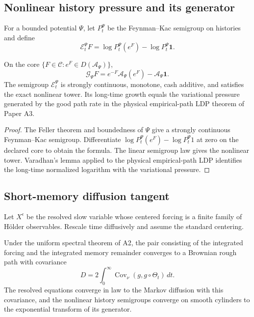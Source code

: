 \subsection{Nonlinear history pressure and its generator}

For a bounded potential \(\Psi\), let \(P_t^\Psi\) be the Feynman--Kac
semigroup on histories and define
\[
 \mathcal E_t^\Psi F
 =
 \log P_t^\Psi(e^F)-\log P_t^\Psi\mathbf1 .
\]

\begin{theorem}
\label{thm:rr2-a4-nonlinear-generator}
On the core
\(\{F\in\mathscr C:e^F\in D(\mathcal A_\Psi)\}\),
\[
 \mathcal G_\Psi F
 =
 e^{-F}\mathcal A_\Psi(e^F)
 -
 \mathcal A_\Psi\mathbf1 .
\]
The semigroup \(\mathcal E_t^\Psi\) is strongly continuous, monotone, cash
additive, and satisfies the exact nonlinear tower.  Its long-time growth
equals the variational pressure generated by the good path rate in
the physical empirical-path LDP theorem of Paper A3.
\end{theorem}

\begin{proof}
The Feller theorem and boundedness of \(\Psi\) give a strongly continuous
Feynman--Kac semigroup.  Differentiate
\(\log P_t^\Psi(e^F)-\log P_t^\Psi1\) at zero on the declared core to obtain
the formula.  The linear semigroup law gives the nonlinear tower.
Varadhan's lemma applied to the physical empirical-path LDP identifies the
long-time normalized logarithm with the variational pressure.
\end{proof}

\subsection{Short-memory diffusion tangent}

Let \(X^\epsilon\) be the resolved slow variable whose centered forcing is a
finite family of Hölder observables.  Rescale time diffusively and assume the
standard centering.

\begin{theorem}
\label{thm:rr2-a4-tangent}
Under the uniform spectral theorem of A2, the pair consisting of the
integrated forcing and the integrated memory remainder converges to a
Brownian rough path with covariance
\[
 D=2\int_0^\infty\operatorname{Cov}_\nu(g,g\circ\Theta_t)\,dt.
\]
The resolved equations converge in law to the Markov diffusion with this
covariance, and the nonlinear history semigroups converge on smooth
cylinders to the exponential transform of its generator.
\end{theorem}


